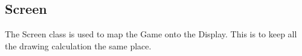 \subsection{Screen}

The Screen class is used to map the Game onto the Display. This is to keep all the drawing calculation the same place.

